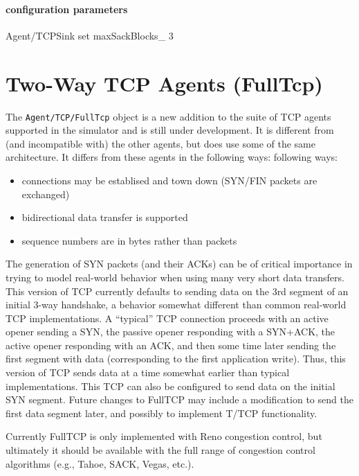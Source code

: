 \paragraph{configuration parameters}
\begin{program}
	Agent/TCPSink set maxSackBlocks_ 3
\end{program}

\section{Two-Way TCP Agents (FullTcp)}
\label{sec:fulltcp}

The {\tt Agent/TCP/FullTcp} object is a new addition to the suite of
TCP agents supported in the simulator and is still under development.
It is different from (and incompatible with) the other agents, but
does use some of the same architecture.
It differs from these agents in the following ways:
following ways:
\begin{itemize}\itemsep0pt
\item connections may be establised and town down
(SYN/FIN packets are exchanged)
\item bidirectional data transfer is supported
\item sequence numbers are in bytes rather than packets
\end{itemize}

The generation of SYN packets (and their ACKs) can be
of critical importance in trying to model real-world behavior
when using many very short data transfers.
This version of TCP currently defaults to sending
data on the 3rd segment of an initial 3-way handshake, a behavior
somewhat different than common real-world TCP implementations.
A ``typical'' TCP connection proceeds with an active opener
sending a SYN, the passive opener responding with a SYN+ACK,
the active opener responding with an ACK, and then some time later
sending the first segment with data (corresponding to the first
application write).
Thus, this version of TCP sends data at a time somewhat earlier
than typical implementations.
This TCP can also be configured to send data on the initial SYN
segment.
Future changes to FullTCP may include a modification to send the
first data segment later, and possibly to implement T/TCP functionality.

Currently FullTCP is only implemented with Reno congestion control,
but ultimately it should be available with the full range of
congestion control algorithms (e.g., Tahoe, SACK, Vegas, etc.).


